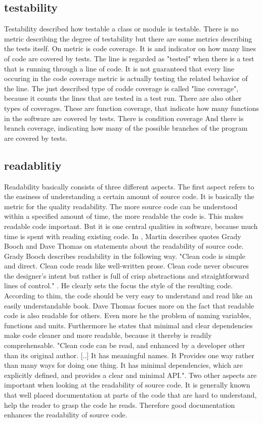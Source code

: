 \subsection{testability}
Testability described how testable a class or module is testable. There is no metric describing the degree of testability but there are some metrics describing the tests itself. 
On metric is code coverage. It is and indicator on how many lines of code are covered by tests. The line is regarded as "tested" when there is a test that is running through a line of code. It is not guaranteed that every line occuring in the code coverage metric is actually testing the related behavior of the line. 
The just described type of codde coverage is called "line coverage", because it counts the lines that are tested in a test run. There are also other types of coverages. These are function coverage, that indicate how many functions in the software are covered by tests. There is condition coverage %
And there is branch coverage, indicating how many of the possible branches of the program are covered by tests. 

\subsection{readablitiy}
Readability basically consists of three different aspects. 
The first aspect refers to the easiness of understanding a certain amount of source code. It is basically the metric for the quality readability.  The more source code can be understood within a specified amount of time, the more readable the code is. This makes readable code important. But it is one central qualities in software, because much time is spent with reading existing code. In \cite{cc}, Martin describes quotes Grady Booch and Dave Thomas on statements about the readability of source code. Grady Booch describes readability in the following way. "Clean code is simple and direct. Clean code reads like well-written prose. Clean code never obscures the designer’s intent but rather is full of crisp abstractions and straightforward lines of control." \cite[p. 8]{cc}. He clearly sets the focus the style of the resulting code. According to thim, the code should be very easy to understand and read like an easily understandable book. Dave Thomas focues more on the fact that readable code is also readable for others. Even more he the problem of naming variables, functions and units. Furthermore he states that minimal and clear dependencies make code cleaner and more readable, because it thereby is readily comprehensable. "Clean code can be read, and enhanced by a developer other than its original author. [..] It has meaningful names. It  Provides one way rather than many ways for doing one thing. It has minimal dependencies, which are explicitly defined, and provides a clear and minimal  API."\cite[p. 9]{cc}. 
Two other aspects are important when looking at the readability of source code. It is generally known that well placed documentation at parts of the code that are hard to understand, help the reader to grasp the code he reads. Therefore good documentation enhances the readability of source code.

